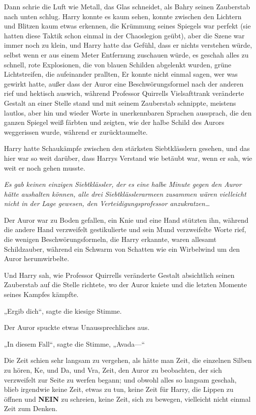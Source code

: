 {Dann schrie die Luft wie Metall, das Glas schneidet, als Bahry seinen Zauberstab nach unten schlug. Harry konnte es kaum sehen, konnte zwischen den Lichtern und Blitzen kaum etwas erkennen, die Krümmung seines Spiegels war perfekt (sie hatten diese Taktik schon einmal in der Chaoslegion geübt), aber die Szene war immer noch zu klein, und Harry hatte das Gefühl, dass er nichts verstehen würde, selbst wenn er aus einem Meter Entfernung zuschauen würde, es geschah alles zu schnell, rote Explosionen, die von blauen Schilden abgelenkt wurden, grüne Lichtstreifen, die aufeinander prallten, Er konnte nicht einmal sagen, wer was gewirkt hatte, außer dass der Auror eine Beschwörungsformel nach der anderen rief und hektisch auswich, während Professor Quirrells Vielsafttrank veränderte Gestalt an einer Stelle stand und mit seinem Zauberstab schnippte, meistens lautlos, aber hin und wieder Worte in unerkennbaren Sprachen aussprach, die den ganzen Spiegel weiß färbten und zeigten, wie der halbe Schild des Aurors weggerissen wurde, während er zurücktaumelte.

Harry hatte Schaukämpfe zwischen den stärksten Siebtklässlern gesehen, und das hier war so weit darüber, dass Harrys Verstand wie betäubt war, wenn er sah, wie weit er noch gehen musste.

\emph{Es gab keinen einzigen Siebtklässler, der es eine halbe Minute gegen den Auror hätte aushalten können, alle drei Siebtklässlerarmeen zusammen wären vielleicht nicht in der Lage gewesen, den Verteidigungsprofessor anzukratzen…}

Der Auror war zu Boden gefallen, ein Knie und eine Hand stützten ihn, während die andere Hand verzweifelt gestikulierte und sein Mund verzweifelte Worte rief, die wenigen Beschwörungsformeln, die Harry erkannte, waren allesamt Schildzauber, während ein Schwarm von Schatten wie ein Wirbelwind um den Auror herumwirbelte.

Und Harry sah, wie Professor Quirrells veränderte Gestalt absichtlich seinen Zauberstab auf die Stelle richtete, wo der Auror kniete und die letzten Momente seines Kampfes kämpfte.

„Ergib dich“, sagte die kiesige Stimme.

Der Auror spuckte etwas Unaussprechliches aus.

„In diesem Fall“, sagte die Stimme, „Avada—“

Die Zeit schien sehr langsam zu vergehen, als hätte man Zeit, die einzelnen Silben zu hören, Ke, und Da, und Vra, Zeit, den Auror zu beobachten, der sich verzweifelt zur Seite zu werfen begann; und obwohl alles so langsam geschah, blieb irgendwie keine Zeit, etwas zu tun, keine Zeit für Harry, die Lippen zu öffnen und \textbf{NEIN} zu schreien, keine Zeit, sich zu bewegen, vielleicht nicht einmal Zeit zum Denken.

}
